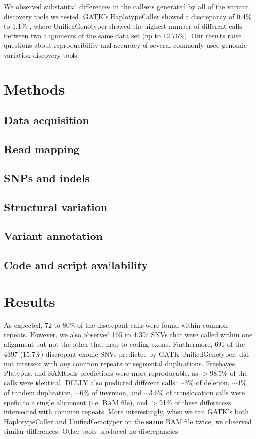 \documentclass[10pt,a4paper]{article}
\begin{document}
We observed substantial differences in the callsets generated by all of the variant discovery tools we tested. GATK's HaplotypeCaller showed a discrepancy of 0.4\% to 1.1\% , 
where UnifiedGenotyper showed the highest number of different calls between two alignments of the same data set (up to 12.76\%). 
Our results raise questions about reproducibility and accuracy of several commonly used genomic variation discovery tools. 





\section{Methods}

\subsection{Data acquisition}
\subsection{Read mapping}
\subsection{SNPs and indels}
\subsection{Structural variation}
\subsection{Variant annotation}
\subsection{Code and script availability}

\section{Results}

As expected, 72 to 80\% of the discrepant calls were found within common repeats. However, we also observed 165 to 4,397 SNVs 
that were called within one alignment but not the other that map to coding exons. 
Furthermore, 691 of the 4397 (15.7\%) discrepant exonic SNVs predicted by GATK UnifiedGenotyper,  did not intersect with any common repeats or segmental duplications.
Freebayes, Platypus, and SAMtools predictions were more reproducable, as $>$98.5\% of the calls were identical.
DELLY also predicted different calls: $\sim$3\% of deletion, $\sim$4\% of tandem duplication, $\sim$6\% of inversion, and $\sim$3.6\% of translocation calls were spefic to a single alignment (i.e. BAM file), and $>$91\% of
these differences intersected with common repeats. More interestingly, when we ran GATK's both HaplotypeCaller and UnifiedGenotyper on the {\bf same} BAM file twice, we observed similar differences. Other tools produced no discrepancies.
\end{document}
